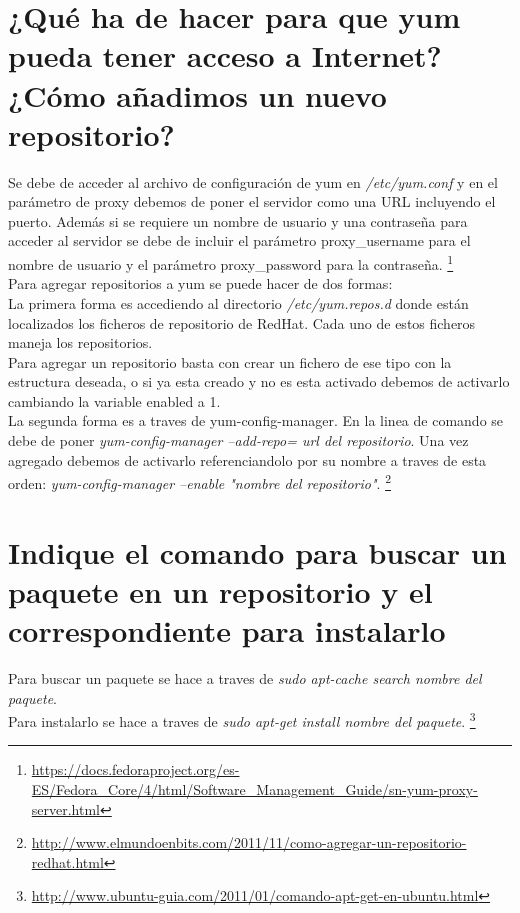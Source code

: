 \section{¿Qué ha de hacer para que yum pueda tener acceso a Internet?¿Cómo añadimos un nuevo repositorio?}

Se debe de acceder al archivo de configuración de yum en \textit{/etc/yum.conf} y en el parámetro de proxy debemos de poner el servidor como una URL incluyendo el puerto. 
Además si se requiere un nombre de usuario y una contraseña para acceder al servidor se debe de incluir el parámetro proxy\_username para el nombre de usuario y el parámetro proxy\_password para la contraseña. \footnote{\url{https://docs.fedoraproject.org/es-ES/Fedora_Core/4/html/Software_Management_Guide/sn-yum-proxy-server.html}}
\\Para agregar repositorios a yum se puede hacer de dos formas:
\\La primera forma es accediendo al directorio \textit{/etc/yum.repos.d} donde están localizados los ficheros de repositorio de RedHat. Cada uno de estos ficheros maneja los repositorios.
\\Para agregar un repositorio basta con crear un fichero de ese tipo con la estructura deseada, o si ya esta creado y no es esta activado debemos de activarlo cambiando la variable enabled a 1.
\\La segunda forma es a traves de yum-config-manager.
En la linea de comando se debe de poner \textit{yum-config-manager --add-repo= url del repositorio}. Una vez agregado debemos de activarlo referenciandolo por su nombre a traves de esta orden: \textit{yum-config-manager --enable "nombre del repositorio"}.
\footnote{\url{http://www.elmundoenbits.com/2011/11/como-agregar-un-repositorio-redhat.html}}
\section{Indique el comando para buscar un paquete en un repositorio y el correspondiente para instalarlo}

Para buscar un paquete se hace a traves de \textit{sudo apt-cache search nombre del paquete}.
\\Para instalarlo se hace a traves de \textit{sudo apt-get install nombre del paquete}.
\footnote{\url{http://www.ubuntu-guia.com/2011/01/comando-apt-get-en-ubuntu.html}}

\newpage
